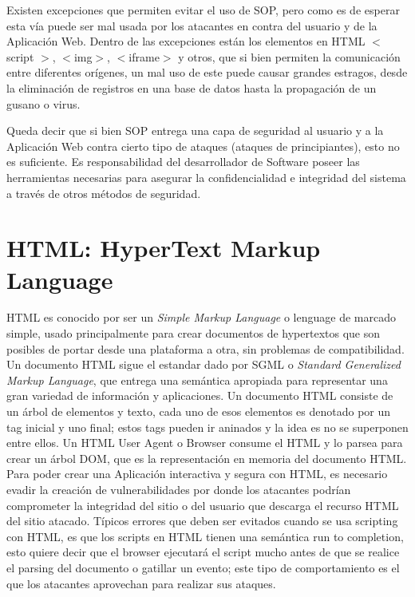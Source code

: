 Existen excepciones que permiten evitar el uso de SOP, pero como es de esperar esta vía puede ser mal usada por los atacantes en contra del usuario y de la Aplicación Web. Dentro de las excepciones están los elementos en HTML \(<\) script \(>\), \(<\)img\(>\), \(<\)iframe\(>\) y otros, que si bien permiten la comunicación entre diferentes orígenes, un mal uso de este puede causar grandes estragos, desde la eliminación de registros en una base de datos hasta la propagación de un gusano o virus.
    
Queda decir que si bien SOP entrega una capa de seguridad al usuario y a la Aplicación Web contra cierto tipo de ataques (ataques de principiantes), esto no es suficiente. Es responsabilidad del desarrollador de Software poseer las herramientas necesarias para asegurar la confidencialidad e integridad del sistema a través de otros métodos de seguridad.
    


\section{HTML: HyperText Markup Language}
\label{chap:HTML}
HTML \cite{htmlSpec} es conocido por ser un \textit{Simple Markup Language} o lenguage de marcado simple, usado principalmente para crear documentos de hypertextos que son posibles de portar desde una plataforma a otra, sin problemas de compatibilidad. Un documento HTML sigue el estandar dado por SGML o \textit{Standard Generalized Markup Language}, que entrega una semántica apropiada para representar una gran variedad de información y aplicaciones. Un documento HTML consiste de un árbol de elementos y texto, cada uno de esos elementos es denotado por un tag inicial y uno final; estos tags pueden ir aninados y la idea es no se superponen entre ellos. Un HTML User Agent o Browser consume el HTML y lo parsea para crear un árbol DOM, que es la representación en memoria del documento HTML.
Para poder crear una Aplicación interactiva y segura con HTML, es necesario evadir la creación de vulnerabilidades por donde los atacantes podrían comprometer la integridad del sitio o del usuario que descarga el recurso HTML del sitio atacado. Típicos errores que deben ser evitados cuando se usa scripting con HTML, es que los scripts en HTML tienen una semántica run to completion, esto quiere decir que el browser ejecutará el script mucho antes de que se realice el parsing del documento o gatillar un evento; este tipo de comportamiento es el que los atacantes aprovechan para realizar sus ataques.

